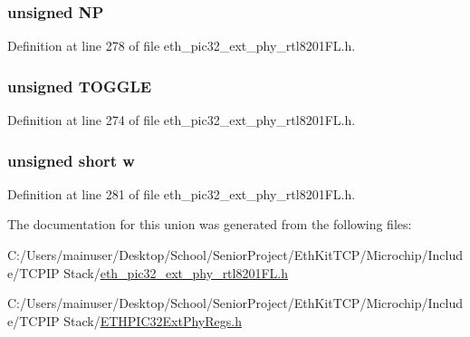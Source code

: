 \subsubsection[{N\+P}]{\setlength{\rightskip}{0pt plus 5cm}unsigned N\+P}\label{union_____a_n_n_p_t_rbits__t_ac89729be1dc289730931f8238a316516}


Definition at line 278 of file eth\+\_\+pic32\+\_\+ext\+\_\+phy\+\_\+rtl8201\+F\+L.\+h.

\hypertarget{union_____a_n_n_p_t_rbits__t_ab4110904eded0b4b6a2280a6b4b9f4c2}{}
\subsubsection[{T\+O\+G\+G\+L\+E}]{\setlength{\rightskip}{0pt plus 5cm}unsigned T\+O\+G\+G\+L\+E}\label{union_____a_n_n_p_t_rbits__t_ab4110904eded0b4b6a2280a6b4b9f4c2}


Definition at line 274 of file eth\+\_\+pic32\+\_\+ext\+\_\+phy\+\_\+rtl8201\+F\+L.\+h.

\hypertarget{union_____a_n_n_p_t_rbits__t_a160850a4684a3e82c2323033964f2e98}{}
\subsubsection[{w}]{\setlength{\rightskip}{0pt plus 5cm}unsigned short w}\label{union_____a_n_n_p_t_rbits__t_a160850a4684a3e82c2323033964f2e98}


Definition at line 281 of file eth\+\_\+pic32\+\_\+ext\+\_\+phy\+\_\+rtl8201\+F\+L.\+h.



The documentation for this union was generated from the following files\+:\begin{DoxyCompactItemize}
\item 
C\+:/\+Users/mainuser/\+Desktop/\+School/\+Senior\+Project/\+Eth\+Kit\+T\+C\+P/\+Microchip/\+Include/\+T\+C\+P\+I\+P Stack/\hyperlink{eth__pic32__ext__phy__rtl8201_f_l_8h}{eth\+\_\+pic32\+\_\+ext\+\_\+phy\+\_\+rtl8201\+F\+L.\+h}\item 
C\+:/\+Users/mainuser/\+Desktop/\+School/\+Senior\+Project/\+Eth\+Kit\+T\+C\+P/\+Microchip/\+Include/\+T\+C\+P\+I\+P Stack/\hyperlink{_e_t_h_p_i_c32_ext_phy_regs_8h}{E\+T\+H\+P\+I\+C32\+Ext\+Phy\+Regs.\+h}\end{DoxyCompactItemize}
